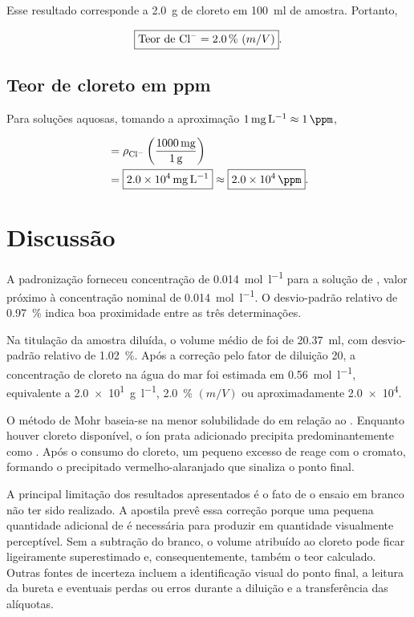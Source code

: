 \documentclass[a4paper,12pt]{article}
\begin{document}
Esse resultado corresponde a \qty{2.0}{\gram} de cloreto em
\qty{100}{\milli\litre} de amostra. Portanto,

\begin{equation}
  \boxed{\text{Teor de \ce{Cl-}}=\qty{2.0}{\percent}\ (m/V)}.
  \label{eq:cloreto_percentual}
\end{equation}

\subsection{Teor de cloreto em ppm}

Para soluções aquosas, tomando a aproximação
$\qty{1}{\milli\gram\per\litre}\approx\qty{1}{\ppm}$,

\begin{align}
  [\ce{Cl-}]
  &=
  \rho_{\ce{Cl-}}
  \left(\frac{\qty{1000}{\milli\gram}}{\qty{1}{\gram}}\right)
  \nonumber\\
  &=\boxed{\qty{2.0e4}{\milli\gram\per\litre}}
  \approx\boxed{\qty{2.0e4}{\ppm}}.
  \label{eq:cloreto_ppm}
\end{align}

\section{Discussão}

A padronização forneceu concentração de
\qty{0.014}{\mole\per\litre} para a solução de , valor
próximo à concentração nominal de \qty{0.014}{\mole\per\litre}. O
desvio-padrão relativo de \qty{0.97}{\percent} indica boa proximidade
entre as três determinações.

Na titulação da amostra diluída, o volume médio de  foi de
\qty{20.37}{\milli\litre}, com desvio-padrão relativo de
\qty{1.02}{\percent}. Após a correção pelo fator de diluição 20, a
concentração de cloreto na água do mar foi estimada em
\qty{0.56}{\mole\per\litre}, equivalente a
\qty{2.0e1}{\gram\per\litre}, \qty{2.0}{\percent} $(m/V)$ ou
aproximadamente \qty{2.0e4}{\ppm}.

O método de Mohr baseia-se na menor solubilidade do  em relação
ao . Enquanto houver cloreto disponível, o íon prata
adicionado precipita predominantemente como . Após o consumo do
cloreto, um pequeno excesso de  reage com o cromato, formando o
precipitado vermelho-alaranjado que sinaliza o ponto final.

A principal limitação dos resultados apresentados é o fato de o ensaio
em branco não ter sido realizado. A apostila prevê essa correção porque
uma pequena quantidade adicional de  é necessária para produzir
 em quantidade visualmente perceptível. Sem a subtração do
branco, o volume atribuído ao cloreto pode ficar ligeiramente
superestimado e, consequentemente, também o teor calculado. Outras fontes
de incerteza incluem a identificação visual do ponto final, a leitura da
bureta e eventuais perdas ou erros durante a diluição e a transferência
das alíquotas.
\end{document}
